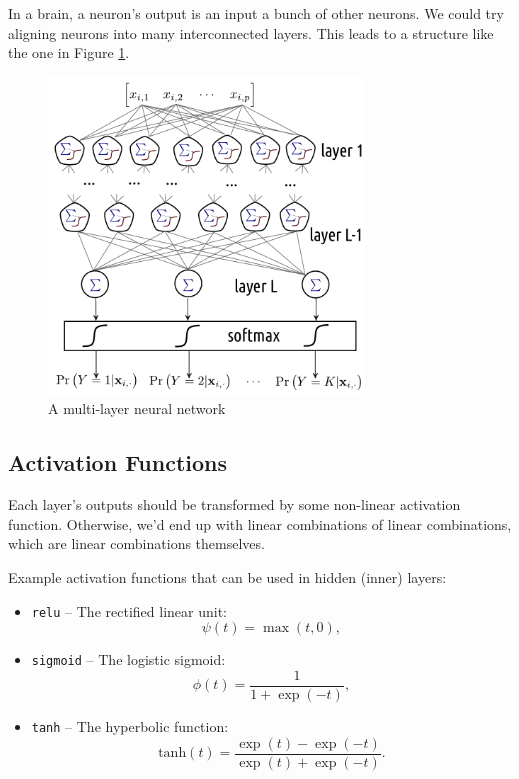 \documentclass[10pt,b5paper,krantz1]{krantz}
\providecommand{\tightlist}{%
  \setlength{\itemsep}{0pt}\setlength{\parskip}{0pt}}
\begin{document}
In a brain, a neuron's output is an input a bunch of other neurons.
We could try aligning neurons into many interconnected layers.
This leads to a structure like the one in Figure \ref{fig:nnet}.

\begin{figure}
\hypertarget{fig:nnet}{%
\centering
\includegraphics[width=0.75\textwidth,height=\textheight]{figures/nnet.pdf}
\caption{A multi-layer neural network}\label{fig:nnet}
}
\end{figure}

\hypertarget{activation-functions}{%
\subsection{Activation Functions}\label{activation-functions}}

Each layer's outputs should be transformed by some non-linear
activation function. Otherwise, we'd end up with linear combinations of linear combinations,
which are linear combinations themselves.

Example activation functions
that can be used in hidden (inner) layers:

\begin{itemize}
\tightlist
\item
  \texttt{relu} -- The rectified linear unit:
  \[\psi(t)=\max(t, 0),\]
\item
  \texttt{sigmoid} -- The logistic sigmoid:
  \[\phi(t)= \frac{1}{1 + \exp(-t)},\]
\item
  \texttt{tanh} -- The hyperbolic function:
  \[\mathrm{tanh}(t) = \frac{\exp(t) - \exp(-t)}{\exp(t) + \exp(-t)}.\]
\end{itemize}
\end{document}
